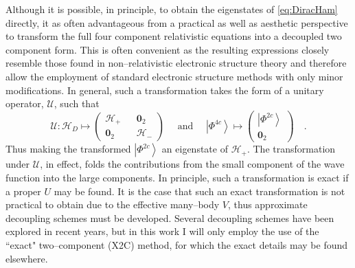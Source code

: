 \documentclass[12pt]{article}
\newcommand{\ket}[1]{\left\vert #1 \right\rangle}         %
\newcommand*\vc[1]{\boldsymbol{#1}}
\newcommand*\op[1]{\mathcal{#1}}
\begin{document}
Although it is possible, in principle, to obtain the eigenstates of
\cref{eq:DiracHam} directly, it as often advantageous from a practical as well
as aesthetic perspective to transform the full four component relativistic
equations into a decoupled two component form. This is often convenient as the
resulting expressions closely resemble those found in non--relativistic
electronic structure theory and therefore allow the employment of standard
electronic structure methods with only minor modifications. In general, such a
transformation takes the form of a unitary operator, $\op{U}$, such that
\begin{equation}
\op{U}: 
\op{H}_D \mapsto \begin{pmatrix}
\op{H}_+ && \vc{0}_2 \\ \vc{0}_2 && \op{H}_- 
\end{pmatrix} \quad \text{ and } \quad
\ket{\Phi^{4c}} \mapsto \begin{pmatrix}
 \ket{\Phi^{2c}} \\ \vc{0}_2
\end{pmatrix} \quad.
\end{equation}
Thus making the transformed $\ket{\Phi^{2c}}$ an eigenstate of $\op{H}_+$.
The transformation under $\op{U}$, in effect, folds the contributions from
the small component of the wave function into the large components. In principle,
such a transformation is exact if a proper $U$ may be found. It is the case
that such an exact transformation is not practical to obtain due to the
effective many--body $V$, thus approximate decoupling schemes must be developed.
Several decoupling schemes have been explored in recent years, but in this work
I will only employ the use of the ``exact" two--component (X2C) method, for which
the exact details may be found elsewhere.
\end{document}
